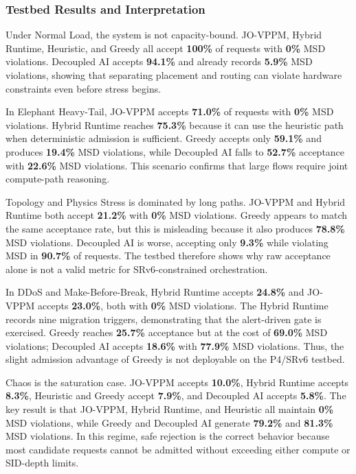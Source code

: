 \documentclass[12pt, a4paper, reqno, oneside]{book}
\begin{document}
\subsubsection{Testbed Results and Interpretation}

Under Normal Load, the system is not capacity-bound. JO-VPPM, Hybrid Runtime, Heuristic, and Greedy all accept \textbf{100\%} of requests with \textbf{0\%} MSD violations. Decoupled AI accepts \textbf{94.1\%} and already records \textbf{5.9\%} MSD violations, showing that separating placement and routing can violate hardware constraints even before stress begins.

In Elephant Heavy-Tail, JO-VPPM accepts \textbf{71.0\%} of requests with \textbf{0\%} MSD violations. Hybrid Runtime reaches \textbf{75.3\%} because it can use the heuristic path when deterministic admission is sufficient. Greedy accepts only \textbf{59.1\%} and produces \textbf{19.4\%} MSD violations, while Decoupled AI falls to \textbf{52.7\%} acceptance with \textbf{22.6\%} MSD violations. This scenario confirms that large flows require joint compute-path reasoning.

Topology and Physics Stress is dominated by long paths. JO-VPPM and Hybrid Runtime both accept \textbf{21.2\%} with \textbf{0\%} MSD violations. Greedy appears to match the same acceptance rate, but this is misleading because it also produces \textbf{78.8\%} MSD violations. Decoupled AI is worse, accepting only \textbf{9.3\%} while violating MSD in \textbf{90.7\%} of requests. The testbed therefore shows why raw acceptance alone is not a valid metric for SRv6-constrained orchestration.

In DDoS and Make-Before-Break, Hybrid Runtime accepts \textbf{24.8\%} and JO-VPPM accepts \textbf{23.0\%}, both with \textbf{0\%} MSD violations. The Hybrid Runtime records nine migration triggers, demonstrating that the alert-driven gate is exercised. Greedy reaches \textbf{25.7\%} acceptance but at the cost of \textbf{69.0\%} MSD violations; Decoupled AI accepts \textbf{18.6\%} with \textbf{77.9\%} MSD violations. Thus, the slight admission advantage of Greedy is not deployable on the P4/SRv6 testbed.

Chaos is the saturation case. JO-VPPM accepts \textbf{10.0\%}, Hybrid Runtime accepts \textbf{8.3\%}, Heuristic and Greedy accept \textbf{7.9\%}, and Decoupled AI accepts \textbf{5.8\%}. The key result is that JO-VPPM, Hybrid Runtime, and Heuristic all maintain \textbf{0\%} MSD violations, while Greedy and Decoupled AI generate \textbf{79.2\%} and \textbf{81.3\%} MSD violations. In this regime, safe rejection is the correct behavior because most candidate requests cannot be admitted without exceeding either compute or SID-depth limits.
\end{document}
